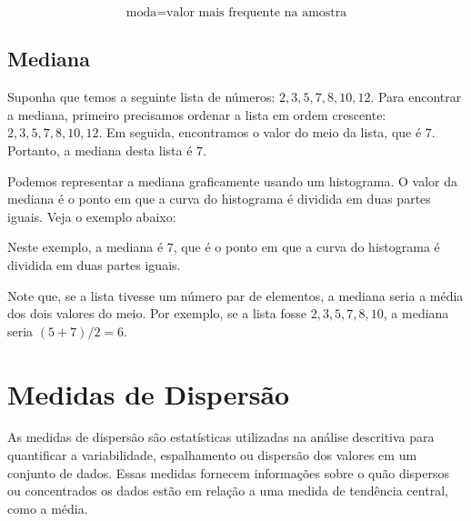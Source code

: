 \[
\text{moda} = \text{valor mais frequente na amostra}
\]

\subsection{Mediana}

Suponha que temos a seguinte lista de números: $2, 3, 5, 7, 8, 10, 12$. Para encontrar a mediana, primeiro precisamos ordenar a lista em ordem crescente: $2, 3, 5, 7, 8, 10, 12$. Em seguida, encontramos o valor do meio da lista, que é $7$. Portanto, a mediana desta lista é $7$.

Podemos representar a mediana graficamente usando um histograma. O valor da mediana é o ponto em que a curva do histograma é dividida em duas partes iguais. Veja o exemplo abaixo:

\begin{center}
\end{center}

Neste exemplo, a mediana é $7$, que é o ponto em que a curva do histograma é dividida em duas partes iguais.

Note que, se a lista tivesse um número par de elementos, a mediana seria a média dos dois valores do meio. Por exemplo, se a lista fosse $2, 3, 5, 7, 8, 10$, a mediana seria $(5+7)/2 = 6$.

\section{Medidas de Dispersão}

As medidas de dispersão são estatísticas utilizadas na análise descritiva para quantificar a variabilidade, espalhamento ou dispersão dos valores em um conjunto de dados. Essas medidas fornecem informações sobre o quão dispersos ou concentrados os dados estão em relação a uma medida de tendência central, como a média.

